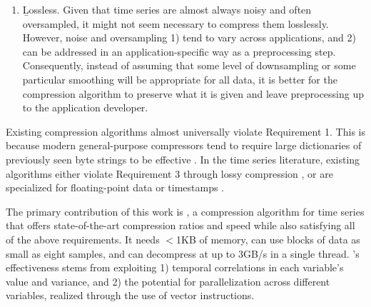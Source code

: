 \begin{enumerate}
\item \b{Lossless}. Given that time series are almost always noisy and often oversampled, it might not seem necessary to compress them losslessly. However, noise and oversampling 1) tend to vary across applications, and 2) can be addressed in an application-specific way as a preprocessing step. Consequently, instead of assuming that some level of downsampling or some particular smoothing will be appropriate for all data, it is better for the compression algorithm to preserve what it is given and leave preprocessing up to the application developer.
\end{enumerate}

Existing compression algorithms almost universally violate Requirement 1. This is because modern general-purpose compressors tend to require large dictionaries of previously seen byte strings to be effective \cite{lz4, snappy, gzip, zlib}. In the time series literature, existing algorithms either violate Requirement 3 through lossy compression \cite{sax, tsCompressSmartGrid, ecgCompressLossy, apca, lemireSegmentation}, or are specialized for floating-point data \cite{gorilla} or timestamps \cite{gorilla, berkeleyTreeDB, fastpfor}.

The primary contribution of this work is \mine,
a compression algorithm for time series that offers state-of-the-art compression ratios and speed while also satisfying all of the above requirements. It needs $<$1KB of memory, can use blocks of data as small as eight samples, and can decompress at up to 3GB/s in a single thread. \mine's effectiveness stems from exploiting 1) temporal correlations in each variable's value and variance, and 2) the potential for parallelization across different variables, realized through the use of vector instructions.

